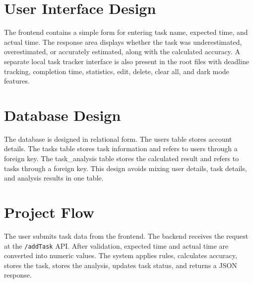 \section{User Interface Design}
\begin{justify}
The frontend contains a simple form for entering task name, expected time, and actual time. The response area displays whether the task was underestimated, overestimated, or accurately estimated, along with the calculated accuracy. A separate local task tracker interface is also present in the root files with deadline tracking, completion time, statistics, edit, delete, clear all, and dark mode features.
\end{justify}

\section{Database Design}
\begin{justify}
The database is designed in relational form. The users table stores account details. The tasks table stores task information and refers to users through a foreign key. The task\_analysis table stores the calculated result and refers to tasks through a foreign key. This design avoids mixing user details, task details, and analysis results in one table.
\end{justify}

\section{Project Flow}
\begin{justify}
The user submits task data from the frontend. The backend receives the request at the \texttt{/addTask} API. After validation, expected time and actual time are converted into numeric values. The system applies rules, calculates accuracy, stores the task, stores the analysis, updates task status, and returns a JSON response.
\end{justify}
